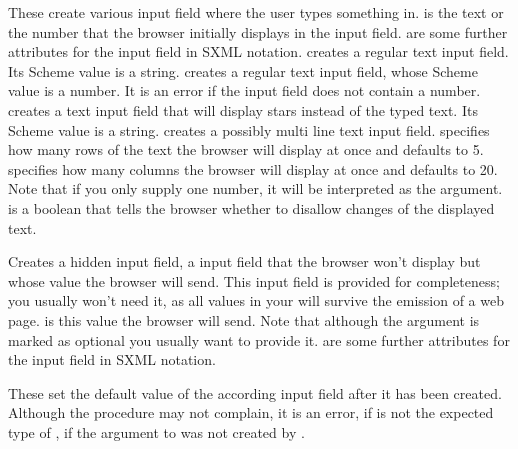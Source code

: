 \begin{desc}
  These create various input field where the user types something in.
   is the text or the number that the browser initially
  displays in the input field.   are some further
  attributes for the input field in SXML notation.
   creates a regular text input field.  Its Scheme
  value is a string.   creates a regular text
  input field, whose Scheme value is a number.  It is an error if the
  input field does not contain a number.  
  creates a text input field that will display stars instead of the
  typed text.  Its Scheme value is a string.  
  creates a possibly multi line text input field.  
  specifies how many rows of the text the browser will display at once
  and defaults to 5.   specifies how many columns the
  browser will display at once and defaults to 20.  Note that if you
  only supply one number, it will be interpreted as the 
  argument.   is a boolean that tells the browser
  whether to disallow changes of the displayed text.
\end{desc}


\begin{desc}
  Creates a hidden input field, \ie a input field that the browser
  won't display but whose value the browser will send.  This input
  field is provided for completeness; you usually won't need it, as
  all values in your \surflet will survive the emission of a web page.
   is this value the browser will send.  Note that
  although the argument is marked as optional you usually want to
  provide it.   are some further attributes for the
  input field in SXML notation.
\end{desc}

\begin{desc}
  These set the default value of the according input field after it
  has been created.  Although the procedure may not complain, it is an
  error, if  is not the expected type of
  , \eg if the argument to 
  was not created by .
\end{desc}

